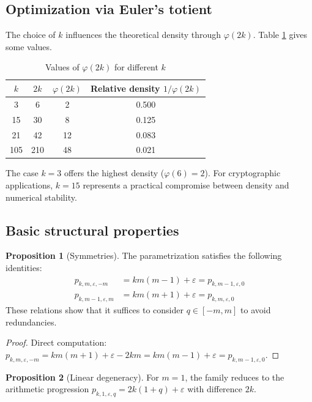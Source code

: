 \documentclass[11pt,a4paper]{article}
\theoremstyle{definition}
\newtheorem{proposition}{Proposition}[section]
\theoremstyle{plain}
\begin{document}
\subsection{Optimization via Euler's totient}

The choice of $k$ influences the theoretical density through $\varphi(2k)$. Table \ref{tab:k-opt} gives some values.

\begin{table}[htbp]
\centering
\caption{Values of $\varphi(2k)$ for different $k$}\label{tab:k-opt}
\begin{tabular}{@{}cccc@{}}
\toprule
$k$ & $2k$ & $\varphi(2k)$ & Relative density $1/\varphi(2k)$ \\
\midrule
3 & 6 & 2 & 0.500 \\
15 & 30 & 8 & 0.125 \\
21 & 42 & 12 & 0.083 \\
105 & 210 & 48 & 0.021 \\
\bottomrule
\end{tabular}
\end{table}

The case $k=3$ offers the highest density ($\varphi(6)=2$). For cryptographic applications, $k=15$ represents a practical compromise between density and numerical stability.

\subsection{Basic structural properties}

\begin{proposition}[Symmetries]\label{prop:sym}
The parametrization satisfies the following identities:
\begin{align}
p_{k,m,\varepsilon,-m} &= km(m-1) + \varepsilon = p_{k,m-1,\varepsilon,0} \label{eq:sym1}\\
p_{k,m-1,\varepsilon,m} &= km(m+1) + \varepsilon = p_{k,m,\varepsilon,0} \label{eq:sym2}
\end{align}
These relations show that it suffices to consider $q \in [-m, m]$ to avoid redundancies.
\end{proposition}

\begin{proof}
Direct computation: $p_{k,m,\varepsilon,-m} = km(m+1) + \varepsilon - 2km = km(m-1) + \varepsilon = p_{k,m-1,\varepsilon,0}$.
\end{proof}

\begin{proposition}[Linear degeneracy]\label{prop:linear}
For $m=1$, the family reduces to the arithmetic progression $p_{k,1,\varepsilon,q} = 2k(1+q) + \varepsilon$ with difference $2k$.
\end{proposition}
\end{document}
